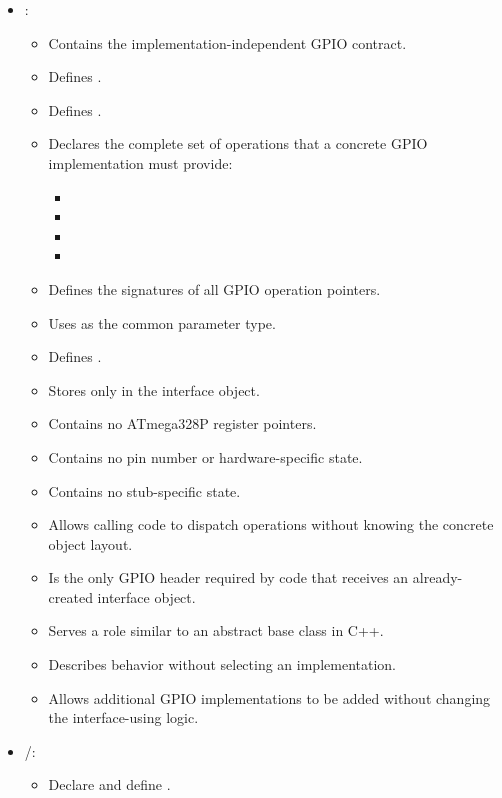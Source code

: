 \begin{itemize}
  \item {}:
  \begin{itemize}
    \item Contains the implementation-independent GPIO contract.
    \item Defines .
    \item Defines .
    \item Declares the complete set of operations that a concrete GPIO implementation must
      provide:
    \begin{itemize}
      \item {}
      \item {}
      \item {}
      \item {}
    \end{itemize}
    \item Defines the signatures of all GPIO operation pointers.
    \item Uses  as the common  parameter type.
    \item Defines .
    \item Stores only  in the interface object.
    \item Contains no ATmega328P register pointers.
    \item Contains no pin number or hardware-specific state.
    \item Contains no stub-specific state.
    \item Allows calling code to dispatch operations without knowing the concrete object layout.
    \item Is the only GPIO header required by code that receives an already-created interface
      object.
    \item Serves a role similar to an abstract base class in C++.
    \item Describes behavior without selecting an implementation.
    \item Allows additional GPIO implementations to be added without changing the
      interface-using logic.
  \end{itemize}
  \item {}/:
  \begin{itemize}
    \item Declare and define .

\end{itemize}
\end{itemize}
